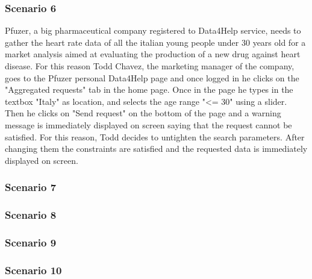 \subsubsection{Scenario 6}
Pfuzer, a big pharmaceutical company registered to Data4Help service, needs to gather the heart rate data of all the italian young people under 30 years old for a market analysis aimed at evaluating the production of a new drug against heart disease. For this reason Todd Chavez, the marketing manager of the company, goes to the Pfuzer personal Data4Help page and once logged  in he clicks on the "Aggregated requests" tab in the home page. Once in the page he types in the textbox "Italy" as location, and selects the age range "<= 30" using a slider. Then he clicks on "Send request" on the bottom of the page and a warning message is immediately displayed on screen saying that the request cannot be satisfied. For this reason, Todd decides to untighten the search parameters. After changing them the constraints are satisfied and the requested data is immediately displayed on screen.
\subsubsection{Scenario 7}
\subsubsection{Scenario 8}
\subsubsection{Scenario 9}
\subsubsection{Scenario 10}
